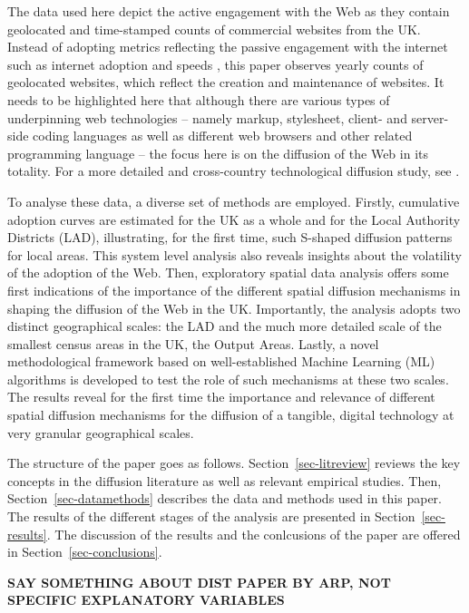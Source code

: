 \documentclass[
  authoryear,
  preprint,
  3p]{elsarticle}
\begin{document}
The data used here depict the active engagement with the Web as they
contain geolocated and time-stamped counts of commercial websites from
the UK. Instead of adopting metrics reflecting the passive engagement
with the internet such as internet adoption and speeds
\citep[e.g.][]{blank2018local, destefano2022fuzzy}, this paper observes
yearly counts of geolocated websites, which reflect the creation and
maintenance of websites. It needs to be highlighted here that although
there are various types of underpinning web technologies -- namely
markup, stylesheet, client- and server-side coding languages as well as
different web browsers and other related programming language -- the
focus here is on the diffusion of the Web in its totality. For a more
detailed and cross-country technological diffusion study, see
\citet{PAPAGIANNIDIS2015308}.

To analyse these data, a diverse set of methods are employed. Firstly,
cumulative adoption curves are estimated for the UK as a whole and for
the Local Authority Districts (LAD), illustrating, for the first time,
such S-shaped diffusion patterns for local areas. This system level
analysis also reveals insights about the volatility of the adoption of
the Web. Then, exploratory spatial data analysis offers some first
indications of the importance of the different spatial diffusion
mechanisms in shaping the diffusion of the Web in the UK. Importantly,
the analysis adopts two distinct geographical scales: the LAD and the
much more detailed scale of the smallest census areas in the UK, the
Output Areas. Lastly, a novel methodological framework based on
well-established Machine Learning (ML) algorithms is developed to test
the role of such mechanisms at these two scales. The results reveal for
the first time the importance and relevance of different spatial
diffusion mechanisms for the diffusion of a tangible, digital technology
at very granular geographical scales.

The structure of the paper goes as follows. Section~\ref{sec-litreview}
reviews the key concepts in the diffusion literature as well as relevant
empirical studies. Then, Section~\ref{sec-datamethods} describes the
data and methods used in this paper. The results of the different stages
of the analysis are presented in Section~\ref{sec-results}. The
discussion of the results and the conlcusions of the paper are offered
in Section~\ref{sec-conclusions}.

\textbf{SAY SOMETHING ABOUT DIST PAPER BY ARP, NOT SPECIFIC EXPLANATORY
VARIABLES}
\end{document}
